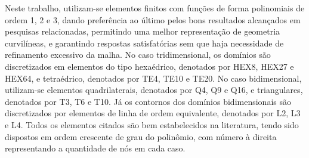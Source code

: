 \documentclass[Tese.tex]{subfiles}
\begin{document}
Neste trabalho, utilizam-se elementos finitos com funções de forma polinomiais de ordem 1, 2 e 3, dando preferência ao último pelos bons resultados alcançados em pesquisas relacionadas, permitindo uma melhor representação de geometria curvilíneas, e garantindo respostas satisfatórias sem que haja necessidade de refinamento excessivo da malha. No caso tridimensional, os domínios são discretizados em elementos do tipo hexaédrico, denotados por HEX8, HEX27 e HEX64, e tetraédrico, denotados por TE4, TE10 e TE20. No caso bidimensional, utilizam-se elementos quadrilaterais, denotados por Q4, Q9 e Q16, e triangulares, denotados por T3, T6 e T10. Já os contornos dos domínios bidimensionais são discretizados por elementos de linha de ordem equivalente, denotados por L2, L3 e L4. Todos os elementos citados são bem estabelecidos na literatura, tendo sido dispostos em ordem crescente de grau do polinômio, com número à direita representando a quantidade de nós em cada caso.


\end{document}
